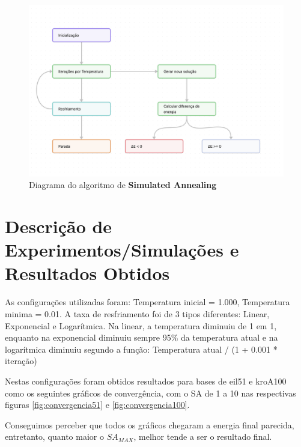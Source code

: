\documentclass[12pt]{article}
\begin{document}
\begin{figure}[H]
    \centering
    \includegraphics[width=1\textwidth]{imgs/final_diagram.png}
    \caption{Diagrama do algoritmo de \textbf{Simulated Annealing}}
    \label{fig:metodologia}
\end{figure}


\section{Descrição de Experimentos/Simulações e Resultados Obtidos}
\label{sec:descicao_de_experimentos_/_simulacoes_e_resultados_obtidos}

As configurações utilizadas foram: Temperatura inicial = 1.000, Temperatura minima = 0.01. A taxa de resfriamento foi de 3 tipos diferentes: Linear, Exponencial e Logarítmica. 
%
Na linear, a temperatura diminuiu de 1 em 1, enquanto na exponencial diminuiu sempre 95\% da temperatura atual e na logarítmica diminuiu segundo a função: Temperatura atual / (1 + 0.001 * iteração)


Nestas configurações foram obtidos resultados para bases de eil51 e kroA100 como os seguintes gráficos de convergência, com o SA de 1 a 10 nas respectivas figuras \ref{fig:convergencia51} e \ref{fig:convergencia100}.

Conseguimos perceber que todos os gráficos chegaram a energia final parecida, entretanto, quanto maior o $SA_{MAX}$, melhor tende a ser o resultado final.
\end{document}
